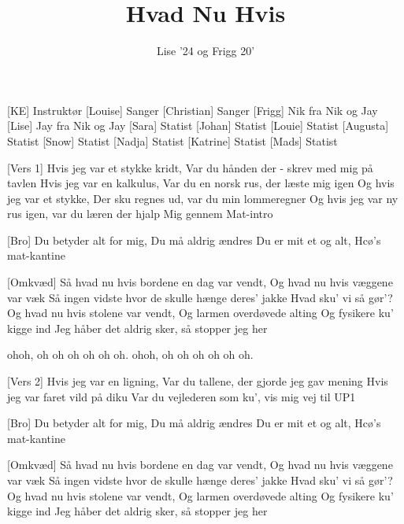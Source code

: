 \documentclass[a4paper,11pt]{article}
\title{Hvad Nu Hvis}
\author{Lise ’24 og Frigg 20’}
\begin{document}
\maketitle

\begin{roles}
[KE] Instruktør
[Louise] Sanger
[Christian] Sanger
[Frigg] Nik fra Nik og Jay
[Lise] Jay fra Nik og Jay
[Sara] Statist
[Johan] Statist
[Louie] Statist
[Augusta] Statist
[Snow] Statist
[Nadja] Statist
[Katrine] Statist
[Mads] Statist
\end{roles}

\begin{song}

[Vers 1] Hvis jeg var et stykke kridt,
Var du hånden der - skrev med mig på tavlen
Hvis jeg var en kalkulus,
Var du en norsk rus, der læste mig igen
Og hvis jeg var et stykke,
Der sku regnes ud, var du min lommeregner
Og hvis jeg var ny rus igen, var du læren der hjalp
Mig gennem Mat-intro

[Bro] Du betyder alt for mig,
Du må aldrig ændres
Du er mit et og alt,
Hcø’s mat-kantine

[Omkvæd] Så hvad nu hvis bordene en dag var vendt,
Og hvad nu hvis væggene var væk
Så ingen vidste hvor de skulle hænge deres’ jakke
Hvad sku’ vi så gør’?
Og hvad nu hvis stolene var vendt,
Og larmen overdøvede alting
Og fysikere ku’ kigge ind
Jeg håber det aldrig sker, så stopper jeg her

ohoh, oh oh oh oh oh oh. ohoh, oh oh oh oh oh oh.

[Vers 2] Hvis jeg var en ligning,
Var du tallene, der gjorde jeg gav mening
Hvis jeg var faret vild på diku
Var du vejlederen som ku’, vis mig vej til UP1

[Bro] Du betyder alt for mig,
Du må aldrig ændres
Du er mit et og alt,
Hcø’s mat-kantine

[Omkvæd] Så hvad nu hvis bordene en dag var vendt,
Og hvad nu hvis væggene var væk
Så ingen vidste hvor de skulle hænge deres’ jakke
Hvad sku’ vi så gør’?
Og hvad nu hvis stolene var vendt,
Og larmen overdøvede alting
Og fysikere ku’ kigge ind
Jeg håber det aldrig sker, så stopper jeg her


\end{song}
\end{document}
